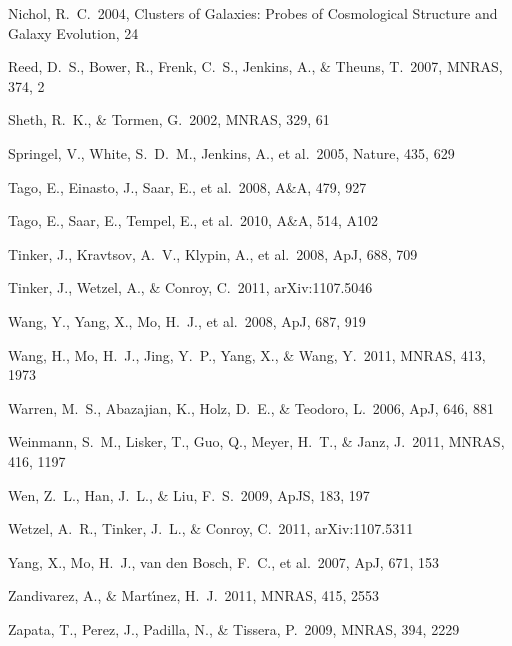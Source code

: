 \documentclass[useAMS,usenatbib]{mn2e}
\newcommand{\mnras}{MNRAS}
\newcommand{\apj}{ApJ}
\newcommand{\apjs}{ApJS}
\newcommand{\aap}{A\&A}
\newcommand{\nat}{Nature}
\begin{document}
\begin{thebibliography}{99}
 Nichol, R.~C.\ 2004,
  Clusters of Galaxies: Probes of Cosmological Structure and Galaxy
  Evolution, 24

 Reed, D.~S., Bower,
  R., Frenk, C.~S., Jenkins, A., \& Theuns, T.\ 2007, \mnras, 374, 2

 Sheth, R.~K., \&
  Tormen, G.\ 2002, \mnras, 329, 61

 Springel, V.,
  White, S.~D.~M., Jenkins, A., et al.\ 2005, \nat, 435, 629

 Tago, E., Einasto,
  J., Saar, E., et al.\ 2008, \aap, 479, 927

 Tago, E., Saar, E.,
  Tempel, E., et al.\ 2010, \aap, 514, A102

 Tinker, J.,
  Kravtsov, A.~V., Klypin, A., et al.\ 2008, \apj, 688, 709

 Tinker, J., Wetzel,
  A., \& Conroy, C.\ 2011, arXiv:1107.5046

 Wang, Y., Yang, X.,
  Mo, H.~J., et al.\ 2008, \apj, 687, 919

 Wang, H., Mo, H.~J.,
  Jing, Y.~P., Yang, X., \& Wang, Y.\ 2011, \mnras, 413, 1973

 Warren, M.~S.,
  Abazajian, K., Holz, D.~E., \& Teodoro, L.\ 2006, \apj, 646, 881

 Weinmann, S.~M.,
  Lisker, T., Guo, Q., Meyer, H.~T., \& Janz, J.\ 2011, \mnras, 416,
  1197

 Wen, Z.~L., Han,
  J.~L., \& Liu, F.~S.\ 2009, \apjs, 183, 197

 Wetzel, A.~R.,
  Tinker, J.~L., \& Conroy, C.\ 2011, arXiv:1107.5311

 Yang, X., Mo, H.~J., van 
den Bosch, F.~C., et al.\ 2007, \apj, 671, 153 

  Zandivarez, A., \& Mart{\'{\i}}nez, H.~J.\ 2011, \mnras, 415, 2553

 Zapata, T., Perez,
  J., Padilla, N., \& Tissera, P.\ 2009, \mnras, 394, 2229


  
\end{thebibliography}


\bsp

\label{lastpage}
\end{document}
